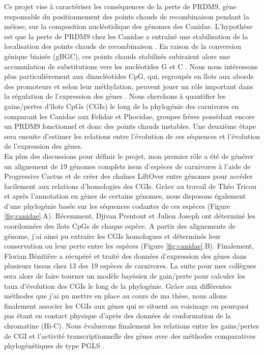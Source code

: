 Ce projet vise à caractériser les conséquences de la perte de PRDM9, gène responsable du positionnement des points chauds de recombinaison pendant la méiose, sur la composition nucléotidique des génomes des Canidae. L’hypothèse est que la perte de PRDM9 chez les Canidae a entraîné une stabilisation de la localisation des points chauds de recombinaison \citep{baudat_prdm9_2010}. En raison de la conversion génique biaisée (gBGC), ces points chauds stabilisés subiraient alors une accumulation de substitutions vers les nucléotides G et C \citep{galtier_gc-content_2001}. Nous nous intéressons plus particulièrement aux dinucléotides CpG, qui, regroupés en îlots aux abords des promoteurs et selon leur méthylation, peuvent jouer un rôle important dans la régulation de l’expression des gènes \citep{deaton_cpg_2011}. Nous cherchons à quantifier les gains/pertes d’îlots CpGs (CGIs) le long de la phylogénie des carnivores en comparant les Canidae aux Felidae et Phocidae, groupes frères possédant encore un PRDM9 fonctionnel et donc des points chauds instables. Une deuxième étape sera ensuite d’estimer les relations entre l’évolution de ces séquences et l’évolution de l’expression des gènes. \\

En plus des discussions pour définir le projet, mon premier rôle a été de générer un alignement de 19 génomes complets issus d'espèces de carnivores à l’aide de Progressive Cactus \citep{armstrong_progressive_2020} et de créer des chaînes LiftOver \citep{kent_human_2012} entre génomes pour accéder facilement aux relations d’homologies des CGIs. Grâce au travail de Théo Tricou et après l'annotation en gènes de certains génomes, nous disposons également d’une phylogénie basée sur les séquences codantes de ces espèces (Figure \ref{fig:canidae}.A). Récemment, Djivan Prentout et Julien Joseph ont déterminé les coordonnées des îlots CpGs de chaque espèce. A partir des alignements de génome, j'ai ainsi pu extraire les CGIs homologues et déterminés leur conservation ou leur perte entre les espèces (Figure \ref{fig:canidae}.B). Finalement, Florian Bénitière a récupéré et traité des données d’expression des gènes dans plusieurs tissus chez 13 des 19 espèces de carnivores. La suite pour mes collègues sera alors de faire tourner un modèle bayésien de gain/perte pour calculer les taux d’évolution des CGIs le long de la phylogénie. Grâce aux différentes méthodes que j'ai pu mettre en place au cours de ma thèse, nous allons finalement associer les CGIs aux gènes qui se situent au voisinage ou pourquoi pas étant en contact physique d'après des données de conformation de la chromatine (Hi-C). Nous évaluerons finalement les relations entre les gains/pertes de CGI et l’activité transcriptionnelle des gènes avec des méthodes comparatives phylogénétiques de type PGLS \citep{adams_phylogenetic_2019, rohlf_comparative_2001}.

